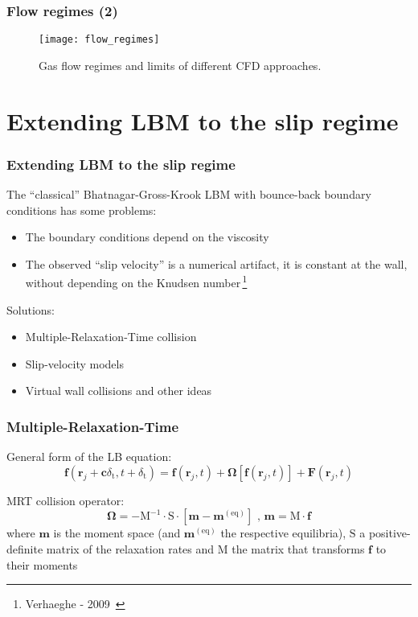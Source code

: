 \documentclass{beamer}
\begin{document}
\begin{frame}
 \frametitle{Flow regimes (2)}
 
 \begin{figure}
  \texttt{[image: flow\_regimes]}
  \caption{Gas flow regimes and limits of different CFD approaches.\,\footnotemark}
 \end{figure}
 
\end{frame}


\section{Extending LBM to the slip regime}

\begin{frame}
 \frametitle{Extending LBM to the slip regime}
 The ``classical'' Bhatnagar-Gross-Krook LBM with bounce-back boundary conditions
 has some problems:
 \begin{itemize}
  \item The boundary conditions depend on the viscosity
  \item The observed ``slip velocity'' is a numerical artifact, 
  it is constant at the wall, without depending on the Knudsen number\,\footnote{Verhaeghe - 2009~\cite{Verhaeghe2009}}
 \end{itemize}

 Solutions:
 \begin{itemize}
  \item Multiple-Relaxation-Time collision
  \item Slip-velocity models
  \item Virtual wall collisions and other ideas
 \end{itemize}
\end{frame}

\begin{frame}
 \frametitle{Multiple-Relaxation-Time}
 General form of the LB equation:
 \begin{equation}
 \mathbf{f}(\mathbf{r}_j + \mathbf{c}\delta_\mathrm{t}, t+\delta_\mathrm{t}) = \mathbf{f}(\mathbf{r}_j, t) + \mathbf{\Omega}[\mathbf{f}(\mathbf{r}_j, t)] + \mathbf{F}(\mathbf{r}_j, t)
\end{equation}

MRT collision operator:
\begin{equation}
 \mathbf{\Omega} = - \mathrm{M}^{-1} \cdot \mathrm{S} \cdot [\mathbf{m} - \mathbf{m}^\mathrm{(eq)}] 
 \textrm{ , \ }
 \mathbf{m} = \mathrm{M} \cdot \mathbf{f}
\end{equation}
where $\mathbf{m}$ is the moment space (and $\mathbf{m}^\mathrm{(eq)}$ the respective equilibria), $\mathrm{S}$ a positive-definite matrix of
the relaxation rates and $\mathrm{M}$ the matrix that transforms $\mathbf{f}$ to
their moments
\end{frame}
\end{document}
